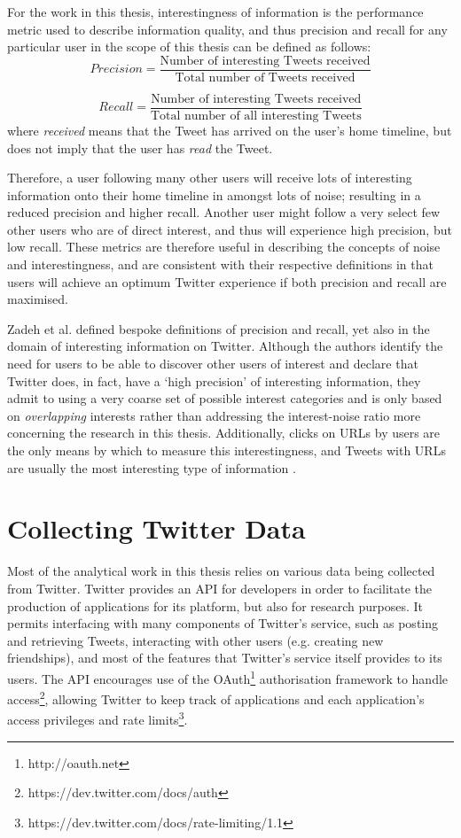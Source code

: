 For the work in this thesis, interestingness of information is the performance metric used to describe information quality, and thus precision and recall for any particular user in the scope of this thesis can be defined as follows:
\[
	Precision = \frac{\text{Number of interesting Tweets received}}{\text{Total number of Tweets received}}
\]

\[
	Recall = \frac{\text{Number of interesting Tweets received}}{\text{Total number of all interesting Tweets}}
\]
where \textit{received} means that the Tweet has arrived on the user's home timeline, but does not imply that the user has \textit{read} the Tweet.

Therefore, a user following many other users will receive lots of interesting information onto their home timeline in amongst lots of noise; resulting in a reduced precision and higher recall. Another user might follow a very select few other users who are of direct interest, and thus will experience high precision, but low recall. These metrics are therefore useful in describing the concepts of noise and interestingness, and are consistent with their respective definitions in that users will achieve an optimum Twitter experience if both precision and recall are maximised.

Zadeh et al. \cite{zadeh13} defined bespoke definitions of precision and recall, yet also in the domain of interesting information on Twitter. Although the authors identify the need for users to be able to discover other users of interest and declare that Twitter does, in fact, have a `high precision' of interesting information, they admit to using a very coarse set of possible interest categories and is only based on \textit{overlapping} interests rather than addressing the interest-noise ratio more concerning the research in this thesis. Additionally, clicks on URLs by users are the only means by which to measure this interestingness, and Tweets with URLs are usually the most interesting type of information \cite{alonso10}.

\section{Collecting Twitter Data}
Most of the analytical work in this thesis relies on various data being collected from Twitter. Twitter provides an API for developers in order to facilitate the production of applications for its platform, but also for research purposes. It permits interfacing with many components of Twitter's service, such as posting and retrieving Tweets, interacting with other users (e.g. creating new friendships), and most of the features that Twitter's service itself provides to its users. The API encourages use of the OAuth\footnote{http://oauth.net} authorisation framework to handle access\footnote{https://dev.twitter.com/docs/auth}, allowing Twitter to keep track of applications and each application's access privileges and rate limits\footnote{https://dev.twitter.com/docs/rate-limiting/1.1}.

